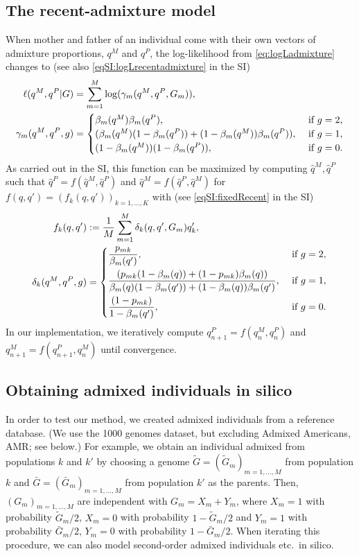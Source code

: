 \documentclass[12pt]{article}
\theoremstyle{definition}
\begin{document}
\subsection{The recent-admixture model}
When mother and father of an individual come with their own vectors of
admixture proportions, $q^M$ and $q^P$, the log-likelihood from
\eqref{eq:logLadmixture} changes to (see also
\eqref{eqSI:logLrecentadmixture} in the SI)
\begin{align}\label{eq:logLrecentadmixture}
  \ell(q^M, q^P|G) & = \sum_{m=1}^M \log( \gamma_m(q^M, q^P, G_m)),
  \\
  \notag
  \gamma_m(q^M, q^P, g) & = \begin{cases}\beta_m(q^M) \beta_m(q^P), & \text{ if }g=2,\\
    (\beta_m(q^M) (1-\beta_m(q^P))
    + (1-\beta_m(q^M)) \beta_m(q^P)), & \text{ if }g=1,\\
    (1-\beta_m(q^M))(1-\beta_m(q^P)), & \text{ if }g=0. \end{cases}
\end{align}
\sloppy As carried out in the SI, this function can be maximized by
computing $\hat q^M, \hat q^P$ such that
$\hat q^P = f(\hat q^M, \hat q^P)$ and
$\hat q^M = f(\hat q^P, \hat q^M)$ for
$f(q,q') = (f_k(q, q'))_{k=1,...,K}$ with (see
\eqref{eqSI:fixedRecent} in the SI)
\begin{align}\label{eq:fixedRecent}
  f_k(q, q') & := \frac{1}{M}\sum_{m=1}^M \delta_k(q,q', G_m) q_k',
  \\
  \notag
  \delta_k(q^M, q^P, g) & = \begin{cases}
    \displaystyle\frac{p_{mk}}{\beta_m(q')}, & \text{ if }g=2,\\[2ex]
    \displaystyle\frac{(p_{mk} (1-\beta_m(q))
      + (1-p_{mk})\beta_m(q))}{\beta_m(q)(1-\beta_m(q'))
      + (1-\beta_m(q))\beta_m(q')}, & \text{ if }g=1,\\[2ex]
    \displaystyle\frac{(1-p_{mk})}{1-\beta_m(q')}, & \text{ if }g=0. \end{cases}
\end{align}
In our implementation, we iteratively compute
$q_{n+1}^P = f(q_n^M, q_n^P)$ and $q_{n+1}^M = f(q_{n+1}^P, q_n^M)$
until convergence.

\subsection{Obtaining admixed individuals in silico}
\label{S:insilico}
In order to test our method, we created admixed individuals from a
reference database. (We use the 1000 genomes dataset, but excluding
Admixed Americans, AMR; see below.) For example, we obtain an
individual admixed from populations $k$ and $k'$ by choosing a genome
$\tilde G = (\tilde G_m)_{m=1,...,M}$ from population $k$ and
$\bar G = (\bar G_m)_{m=1,...,M}$ from population $k'$ as the
parents. Then, $(G_m)_{m=1,...,M}$ are independent with
$G_m = X_m + Y_m$, where $X_m = 1$ with probability $\tilde G_m/2$,
$X_m=0$ with probability $1 - \tilde G_m/2$ and $Y_m = 1$ with
probability $\bar G_m/2$, $Y_m=0$ with probability $1 - \bar
G_m/2$. When iterating this procedure, we can also model second-order
admixed individuals etc.\ in silico.
\end{document}
